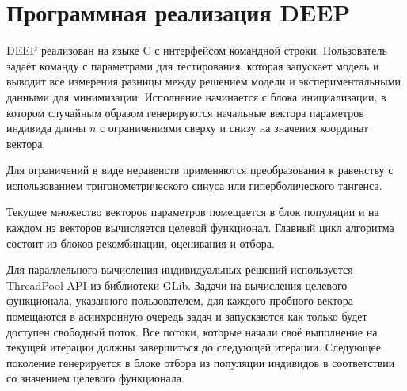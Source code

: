 \section*{Программная реализация DEEP}

DEEP реализован на языке C с интерфейсом командной строки.
Пользователь задаёт команду с параметрами для тестирования,
которая запускает модель и выводит все измерения
разницы между решением модели
и экспериментальными данными для минимизации.
Исполнение начинается с блока инициализации,
в котором случайным образом генерируются
начальные вектора параметров индивида
длины \begin{math}n\end{math}
с ограничениями сверху и снизу
на значения координат вектора.

Для ограничений в виде неравенств
применяются преобразования к равенству
с использованием тригонометрического синуса
или гиперболического тангенса\cite{Kozlov11}.

Текущее множество векторов параметров помещается
в блок популяции и на каждом из векторов
вычисляется целевой функционал.
Главный цикл алгоритма состоит из блоков
рекомбинации, оценивания и отбора.

Для параллельного вычисления индивидуальных решений
используется ThreadPool API из библиотеки GLib.
Задачи на вычисления целевого функционала,
указанного пользователем,
для каждого пробного вектора
помещаются в асинхронную очередь задач
и запускаются как только будет доступен свободный поток. 
Все потоки, которые начали своё выполнение
на текущей итерации должны завершиться
до следующей итерации.
Следующее поколение генерируется в блоке отбора
из популяции индивидов в соответствии
со значением целевого функционала.

